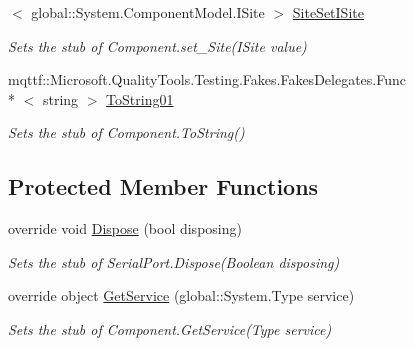 \begin{DoxyCompactItemize}
$<$ global\-::\-System.\-Component\-Model.\-I\-Site $>$ \hyperlink{class_system_1_1_i_o_1_1_ports_1_1_fakes_1_1_stub_serial_port_a391bdd7d31669cce311d8aaf879bd8d8}{Site\-Set\-I\-Site}
\begin{DoxyCompactList}\small\item\em Sets the stub of Component.\-set\-\_\-\-Site(\-I\-Site value)\end{DoxyCompactList}\item 
mqttf\-::\-Microsoft.\-Quality\-Tools.\-Testing.\-Fakes.\-Fakes\-Delegates.\-Func\\*
$<$ string $>$ \hyperlink{class_system_1_1_i_o_1_1_ports_1_1_fakes_1_1_stub_serial_port_a75fc12388c98f17d84e83bc8d7037800}{To\-String01}
\begin{DoxyCompactList}\small\item\em Sets the stub of Component.\-To\-String()\end{DoxyCompactList}\end{DoxyCompactItemize}
\subsection*{Protected Member Functions}
\begin{DoxyCompactItemize}
\item 
override void \hyperlink{class_system_1_1_i_o_1_1_ports_1_1_fakes_1_1_stub_serial_port_a60ba36e983ff46a88bf00bf46ccd42c2}{Dispose} (bool disposing)
\begin{DoxyCompactList}\small\item\em Sets the stub of Serial\-Port.\-Dispose(\-Boolean disposing)\end{DoxyCompactList}\item 
override object \hyperlink{class_system_1_1_i_o_1_1_ports_1_1_fakes_1_1_stub_serial_port_a607bfa26bd9e813c8782afa78ea9aedb}{Get\-Service} (global\-::\-System.\-Type service)
\begin{DoxyCompactList}\small\item\em Sets the stub of Component.\-Get\-Service(\-Type service)\end{DoxyCompactList}\end{DoxyCompactItemize}
